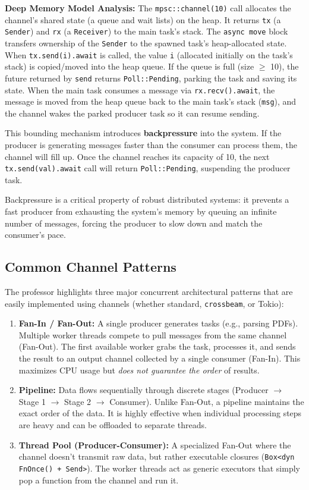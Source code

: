 \textbf{Deep Memory Model Analysis:}
The \texttt{mpsc::channel(10)} call allocates the channel's shared state (a queue and wait lists) on the heap. It returns \texttt{tx} (a \texttt{Sender}) and \texttt{rx} (a \texttt{Receiver}) to the main task's stack. The \texttt{async move} block transfers ownership of the \texttt{Sender} to the spawned task's heap-allocated state. When \texttt{tx.send(i).await} is called, the value \texttt{i} (allocated initially on the task's stack) is copied/moved into the heap queue. If the queue is full (size $\ge$ 10), the future returned by \texttt{send} returns \texttt{Poll::Pending}, parking the task and saving its state. When the main task consumes a message via \texttt{rx.recv().await}, the message is moved from the heap queue back to the main task's stack (\texttt{msg}), and the channel wakes the parked producer task so it can resume sending.


This bounding mechanism introduces \textbf{backpressure} into the system. If the producer is generating messages faster than the consumer can process them, the channel will fill up. Once the channel reaches its capacity of 10, the next \texttt{tx.send(val).await} call will return \texttt{Poll::Pending}, suspending the producer task. 

Backpressure is a critical property of robust distributed systems: it prevents a fast producer from exhausting the system's memory by queuing an infinite number of messages, forcing the producer to slow down and match the consumer's pace.

\subsection{Common Channel Patterns}

The professor highlights three major concurrent architectural patterns that are easily implemented using channels (whether standard, \texttt{crossbeam}, or Tokio):

\begin{enumerate}
    \item \textbf{Fan-In / Fan-Out:} A single producer generates tasks (e.g., parsing PDFs). Multiple worker threads compete to pull messages from the same channel (Fan-Out). The first available worker grabs the task, processes it, and sends the result to an output channel collected by a single consumer (Fan-In). This maximizes CPU usage but \textit{does not guarantee the order} of results.
    \item \textbf{Pipeline:} Data flows sequentially through discrete stages (Producer $\rightarrow$ Stage 1 $\rightarrow$ Stage 2 $\rightarrow$ Consumer). Unlike Fan-Out, a pipeline maintains the exact order of the data. It is highly effective when individual processing steps are heavy and can be offloaded to separate threads.
    \item \textbf{Thread Pool (Producer-Consumer):} A specialized Fan-Out where the channel doesn't transmit raw data, but rather executable closures (\texttt{Box<dyn FnOnce() + Send>}). The worker threads act as generic executors that simply pop a function from the channel and run it.
\end{enumerate}

